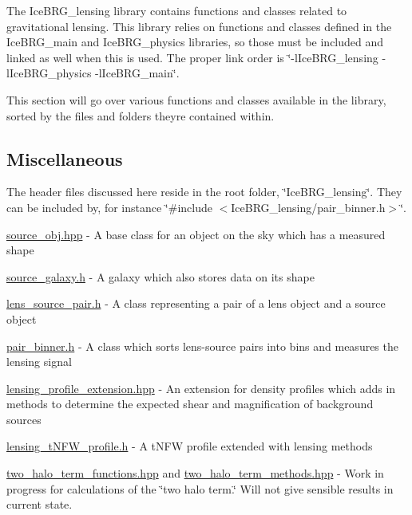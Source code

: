 The Ice\+B\+R\+G\+\_\+lensing library contains functions and classes related to gravitational lensing. This library relies on functions and classes defined in the Ice\+B\+R\+G\+\_\+main and Ice\+B\+R\+G\+\_\+physics libraries, so those must be included and linked as well when this is used. The proper link order is \char`\"{}-\/l\+Ice\+B\+R\+G\+\_\+lensing -\/l\+Ice\+B\+R\+G\+\_\+physics
-\/l\+Ice\+B\+R\+G\+\_\+main\char`\"{}.

This section will go over various functions and classes available in the library, sorted by the files and folders they\textquotesingle{}re contained within.

\subsection*{Miscellaneous}

The header files discussed here reside in the root folder, \char`\"{}\+Ice\+B\+R\+G\+\_\+lensing\char`\"{}. They can be included by, for instance \char`\"{}\#include $<$\+Ice\+B\+R\+G\+\_\+lensing/pair\+\_\+binner.\+h$>$\char`\"{}.


\begin{DoxyItemize}
\item \hyperlink{source__obj_8hpp}{source\+\_\+obj.\+hpp} -\/ A base class for an object on the sky which has a measured shape
\item \hyperlink{source__galaxy_8h}{source\+\_\+galaxy.\+h} -\/ A galaxy which also stores data on its shape
\item \hyperlink{lens__source__pair_8h}{lens\+\_\+source\+\_\+pair.\+h} -\/ A class representing a pair of a lens object and a source object
\item \hyperlink{pair__binner_8h}{pair\+\_\+binner.\+h} -\/ A class which sorts lens-\/source pairs into bins and measures the lensing signal
\item \hyperlink{lensing__profile__extension_8hpp}{lensing\+\_\+profile\+\_\+extension.\+hpp} -\/ An extension for density profiles which adds in methods to determine the expected shear and magnification of background sources
\item \hyperlink{lensing__tNFW__profile_8h}{lensing\+\_\+t\+N\+F\+W\+\_\+profile.\+h} -\/ A t\+N\+F\+W profile extended with lensing methods
\item \hyperlink{two__halo__term__functions_8hpp}{two\+\_\+halo\+\_\+term\+\_\+functions.\+hpp} and \hyperlink{two__halo__term__methods_8hpp}{two\+\_\+halo\+\_\+term\+\_\+methods.\+hpp} -\/ Work in progress for calculations of the \char`\"{}two halo term.\char`\"{} Will not give sensible results in current state.
\end{DoxyItemize}


